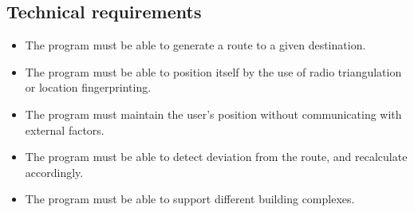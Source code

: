 \subsection{Technical requirements}

\begin{itemize}
	\item The program must be able to generate a route to a given destination.
	\item The program must be able to position itself by the use of radio triangulation or location fingerprinting.
	\item The program must maintain the user's position without communicating with external factors.
	\item The program must be able to detect deviation from the route, and recalculate accordingly.
	\item The program must be able to support different building complexes.
\end{itemize}





